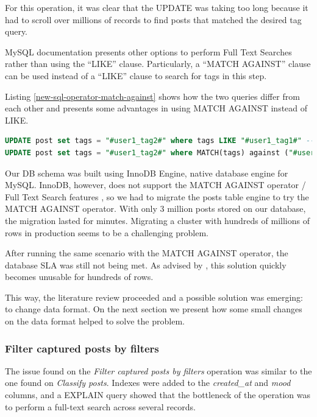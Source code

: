 For this operation, it was clear that the UPDATE was taking too long because it had to scroll over millions of records to find posts that matched the desired tag query.

MySQL documentation presents other options to perform Full Text Searches rather than using the ``LIKE'' clause. Particularly, a ``MATCH AGAINST'' clause can be used instead of a ``LIKE'' clause to search for tags in this step. 

Listing \ref{new-sql-operator-match-against} shows how the two queries differ from each other and \cite{stackoverflowmatch} presents some advantages in using MATCH AGAINST instead of LIKE.

\begin{lstlisting}[language=SQL,firstnumber=1, caption=A new operator - MATCH AGAINST, label=new-sql-operator-match-against]
UPDATE post set tags = "#user1_tag2#" where tags LIKE "#user1_tag1#" -- old sentence
UPDATE post set tags = "#user1_tag2#" where MATCH(tags) against ("#user1_tag1#" IN BOOLEAN MODE) -- new sentence
\end{lstlisting} 

Our DB schema was built using InnoDB Engine, native database engine for MySQL. InnoDB, however, does not support the MATCH AGAINST operator / Full Text Search features \cite{ftsmysql}, so we had to migrate the posts table engine to try the MATCH AGAINST operator. With only 3 million posts stored on our database, the migration lasted for minutes. Migrating a cluster with hundreds of millions of rows in production seems to be a challenging problem. 

After running the same scenario with the MATCH AGAINST operator, the database SLA was still not being met. As advised by \cite{stackoverflowmatch}, this solution quickly becomes unusable for hundreds of rows. 

This way, the literature review proceeded and a possible solution was emerging: to change data format. On the next section we present how some small changes on the data format helped to solve the problem.  



\subsubsection{Filter captured posts by filters}
The issue found on the \textit{Filter captured posts by filters} operation was similar to the one found on \textit{Classify posts}. Indexes were added to the \textit{created\_at} and \textit{mood} columns, and a EXPLAIN query showed that the bottleneck of the operation was to perform a full-text search across several records. 

